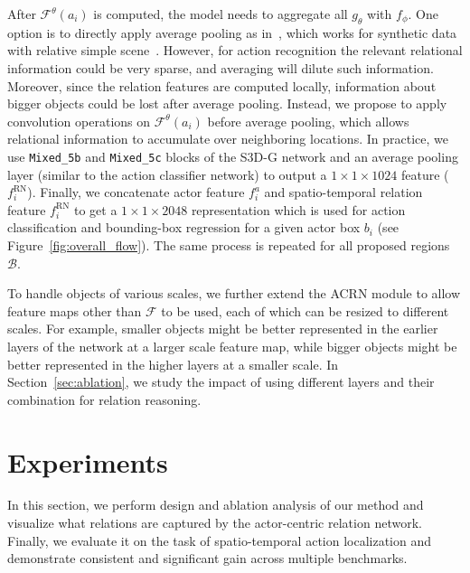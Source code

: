\documentclass[runningheads]{llncs}
\newcommand{\mixed}[1]{\texttt{Mixed\_#1}}
\begin{document}
After $\mathcal{F}^\theta(a_i)$ is computed, the model needs to aggregate all $g_\theta$ with $f_\phi$. One option is to directly apply average pooling as in~\cite{RN_deepmind17}, which works for synthetic data with relative simple scene~\cite{CLEVR}. However, for action recognition the relevant relational information could be very sparse, and averaging will dilute such information. Moreover, since the relation features are computed locally, information about bigger objects could be lost after average pooling. Instead, we propose to apply convolution operations on $\mathcal{F}^\theta(a_i)$ before average pooling, which allows relational information to accumulate over neighboring locations. In practice, we use \mixed{5b} and \mixed{5c} blocks of the S3D-G network and an average pooling layer (similar to the action classifier network) to output a $1\times1\times1024$ feature ($f^{\text{RN}}_i$). Finally, we concatenate actor feature $f^a_i$ and spatio-temporal relation feature $f^{\text{RN}}_i$ to get a $1\times1\times2048$ representation which is used for action classification and bounding-box regression for a given actor box $b_i$ (see Figure~\ref{fig:overall_flow}). The same process is repeated for all proposed regions $\mathcal{B}$.

To handle objects of various scales, we further extend the ACRN module to allow feature maps other than $\mathcal{F}$ to be used, each of which can be resized to different scales. For example, smaller objects might be better represented in the earlier layers of the network at a larger scale feature map, while bigger objects might be better represented in the higher layers at a smaller scale. In Section~\ref{sec:ablation}, we study the impact of using different layers and their combination for relation reasoning. 
\section{Experiments}
In this section, we perform design and ablation analysis of our method and visualize what relations are captured by the actor-centric relation network. Finally, we evaluate it on the task of spatio-temporal action localization and demonstrate consistent and significant gain across multiple benchmarks.
\end{document}
